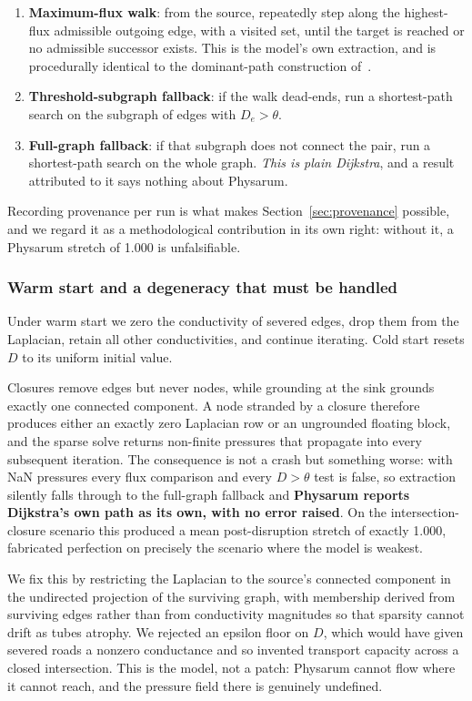 \begin{enumerate}
\item \textbf{Maximum-flux walk}: from the source, repeatedly step along
  the highest-flux admissible outgoing edge, with a visited set, until the
  target is reached or no admissible successor exists. This is the model's
  own extraction, and is procedurally identical to the dominant-path
  construction of~\cite{wang2021transition}.
\item \textbf{Threshold-subgraph fallback}: if the walk dead-ends, run a
  shortest-path search on the subgraph of edges with $D_e > \theta$.
\item \textbf{Full-graph fallback}: if that subgraph does not connect the
  pair, run a shortest-path search on the whole graph. \emph{This is plain
  Dijkstra}, and a result attributed to it says nothing about Physarum.
\end{enumerate}

Recording provenance per run is what makes Section~\ref{sec:provenance}
possible, and we regard it as a methodological contribution in its own right:
without it, a Physarum stretch of 1.000 is unfalsifiable.

\subsubsection{Warm start and a degeneracy that must be handled}

Under warm start we zero the conductivity of severed edges, drop them from
the Laplacian, retain all other conductivities, and continue iterating. Cold
start resets $D$ to its uniform initial value.

Closures remove edges but never nodes, while grounding at the sink grounds
exactly one connected component. A node stranded by a closure therefore
produces either an exactly zero Laplacian row or an ungrounded floating
block, and the sparse solve returns non-finite pressures that propagate into
every subsequent iteration. The consequence is not a crash but something
worse: with NaN pressures every flux comparison and every $D > \theta$ test
is false, so extraction silently falls through to the full-graph fallback and
\textbf{Physarum reports Dijkstra's own path as its own, with no error
raised}. On the intersection-closure scenario this produced a mean
post-disruption stretch of exactly 1.000, fabricated perfection on precisely the scenario where the model is weakest.

We fix this by restricting the Laplacian to the source's connected component
in the undirected projection of the surviving graph, with membership derived
from surviving edges rather than from conductivity magnitudes so that
sparsity cannot drift as tubes atrophy. We rejected an epsilon floor on $D$,
which would have given severed roads a nonzero conductance and so invented
transport capacity across a closed intersection. This is the model, not a
patch: Physarum cannot flow where it cannot reach, and the pressure field
there is genuinely undefined.

